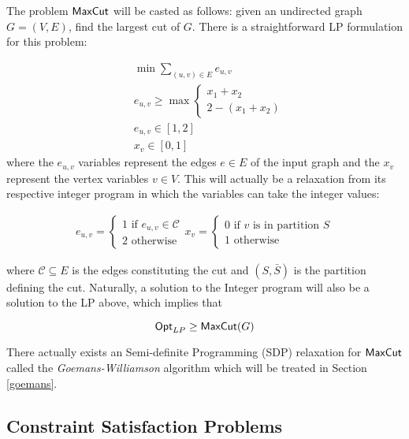 \begin{example} \label{maxcutexample}
The problem $\mathsf{MaxCut}$ will be casted as follows: given an undirected graph $G=(V,E)$, find the largest cut of $G$. There is a straightforward LP formulation for this problem:

\begin{align}
  &  \min \sum_{(u,v) \in E} e_{u,v} \\
  & e_{u,v} \geq
  \max \begin{cases}
      x_1 + x_2 \\
      2 - (x_1 + x_2)
  \end{cases} \\
  & e_{u,v} \in [1,2] \\
  & x_v \in [0,1]
\end{align}
%
where the $e_{u,v}$ variables represent the edges $e \in E$ of the input graph and the $x_v$ represent the vertex variables $v \in V$. This will actually be a relaxation from its respective integer program in which the variables can take the integer values:

\begin{align}
  e_{u,v} = \begin{cases}
              1 \text{ if } e_{u,v} \in \mathcal{C} \\
              2 \text{ otherwise }
            \end{cases}
  x_v = \begin{cases}
              0 \text{ if } v \text{ is in partition } S \\
              1 \text{ otherwise }
        \end{cases}
\end{align}

where $\mathcal{C} \subseteq E$ is the edges constituting the cut and $(S,\bar{S})$ is the partition defining the cut. Naturally, a solution to the Integer program will also be a solution to the LP above, which implies that

\[ \mathsf{Opt}_{LP} \geq \mathsf{MaxCut}(G)\]

There actually exists an Semi-definite Programming (SDP) relaxation for $\mathsf{MaxCut}$ called the \emph{Goemans-Williamson} algorithm which will be treated in Section \ref{goemans}.

\end{example}

\subsection{Constraint Satisfaction Problems}

